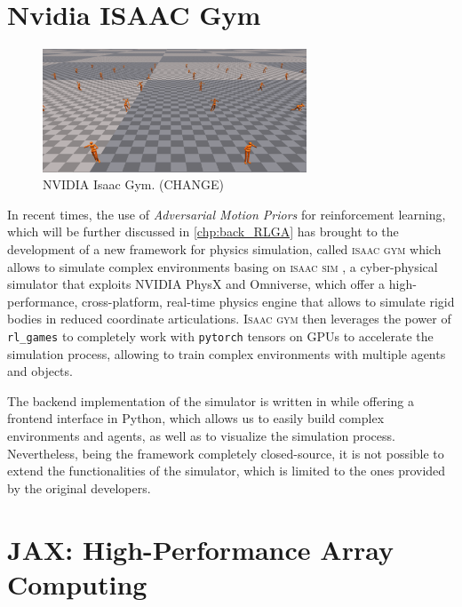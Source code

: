 \section{Nvidia ISAAC Gym}

\begin{figure}
    \centering
    \caption{NVIDIA Isaac Gym. (CHANGE)}
    \label{fig:isaac_gym}
    \includegraphics[width=0.7\textwidth]{Images/isaacgym_humanoid.png}
\end{figure}

In recent times, the use of \textit{Adversarial Motion Priors} \citep{peng_amp_2021} for reinforcement learning, which will be further discussed in \cref{chp:back_RLGA} has brought to the development of a new framework for physics simulation, called \textsc{isaac gym} \citep{makoviychuk_isaac_2021} which allows to simulate complex environments basing on \textsc{isaac sim} \citep{zhou_towards_2023}, a cyber-physical simulator that exploits NVIDIA PhysX and Omniverse, which offer a high-performance, cross-platform, real-time physics engine that allows to simulate rigid bodies in reduced coordinate articulations. \textsc{Isaac gym} then leverages the power of \texttt{rl\_games} \citep{rl-games2021} to completely work with \texttt{pytorch} \citep{paszke_pytorch_2019} tensors on \ac{GPU}s to accelerate the simulation process, allowing to train complex environments with multiple agents and objects.

The backend implementation of the simulator is written in \cpp while offering a frontend interface in Python, which allows us to easily build complex environments and agents, as well as to visualize the simulation process. Nevertheless, being the framework completely closed-source, it is not possible to extend the functionalities of the simulator, which is limited to the ones provided by the original developers.

\section{JAX: High-Performance Array Computing}

